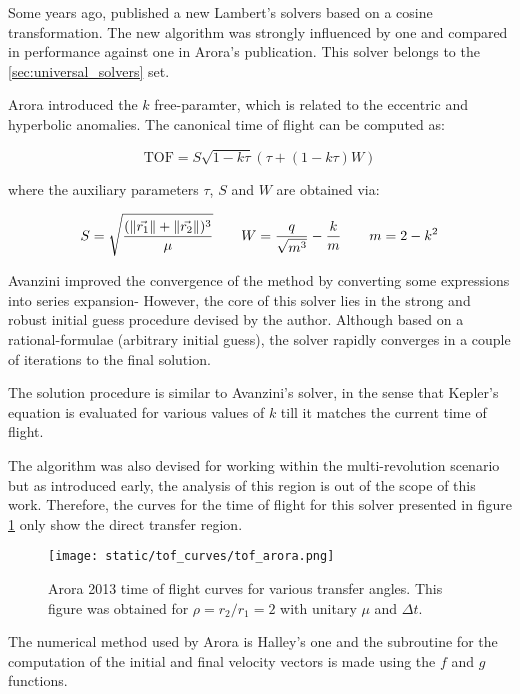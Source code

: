 Some years ago, \cite{arora2013} published a new Lambert's solvers based on a
cosine transformation. The new algorithm was strongly influenced by
\cite{bate1971} one and compared in performance against \cite{gooding1990} one
in Arora's publication. This solver belongs to the \ref{sec:universal_solvers}
set.

Arora introduced the $k$ free-paramter, which is related to the eccentric and
hyperbolic anomalies. The canonical time of flight can be computed as:

\begin{equation}
  \text{TOF} = S\sqrt{1 - k\tau}(\tau + (1 - k\tau)W)
\end{equation}

where the auxiliary parameters $\tau$, $S$ and $W$ are obtained via:

\begin{equation}
  S = \sqrt{\frac{(\lVert\vec{r_1}\rVert + \lVert\vec{r_2}\rVert)^3}{\mu}}\quad\quad
  W = \frac{q}{\sqrt{m ^3}} - \frac{k}{m}\quad\quad
  m = 2 - k^2
\end{equation}

Avanzini improved the convergence of the method by converting some expressions
into series expansion- However, the core of this solver lies in the strong and
robust initial guess procedure devised by the author. Although based on a
rational-formulae (arbitrary initial guess), the solver rapidly converges in a
couple of iterations to the final solution.

The solution procedure is similar to Avanzini's solver, in the sense that
Kepler's equation is evaluated for various values of $k$ till it matches the
current time of flight.

The algorithm was also devised for working within the multi-revolution scenario
but as introduced early, the analysis of this region is out of the scope of this
work. Therefore, the curves for the time of flight for this solver presented in
figure \ref{fig:tof_arora} only show the direct transfer region.

\vspace{0.5cm}
\begin{figure}[h]
  \centering
  \texttt{[image: static/tof\_curves/tof\_arora.png]}
  \caption{Arora 2013 time of flight curves for various transfer angles. This
    figure was obtained for $\rho=r_2/r_1=2$ with unitary $\mu$ and $\Delta t$.}
  \label{fig:tof_arora}
\end{figure}

The numerical method used by Arora is Halley's one and the subroutine for the
computation of the initial and final velocity vectors is made using the $f$ and
$g$ functions.


